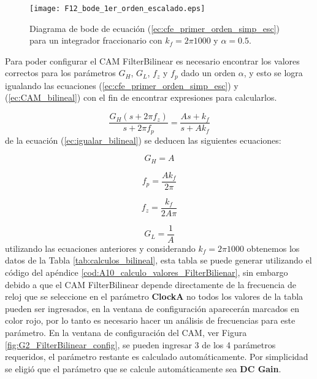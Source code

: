 	\begin{figure}[hbtp]
		\caption{Diagrama de bode de ecuación (\ref{ec:cfe_primer_orden_simp_esc}) para un integrador fraccionario con $k_{f} = 2\pi 1000$ y  $\alpha = 0.5$.} 
		\label{fig:F12_bode_1er_orden_escalado}
		\centering
		\texttt{[image: F12\_bode\_1er\_orden\_escalado.eps]}
	\end{figure}
	
	 Para poder configurar el CAM FilterBilinear es necesario encontrar los valores correctos para los parámetros $G_{H}$, $G_{L}$, $f_{z}$ y $f_{p}$ dado un orden $\alpha$, y esto se logra igualando las ecuaciones (\ref{ec:cfe_primer_orden_simp_esc}) y (\ref{ec:CAM_bilineal}) con el fin de encontrar expresiones para calcularlos.
	 
	 \begin{equation}
	 \frac{G_{H}(s + 2 \pi f_{z})}{s + 2 \pi f_{p}} = \frac{As + k_{f}}{s + A k_{f}}
	 \label{ec:igualar_bilineal}
	 \end{equation}
	 de la ecuación (\ref{ec:igualar_bilineal}) se deducen las siguientes ecuaciones:
	 
	 \begin{equation}
		 G_{H} = A
		 \label{ec:bilineal_gh}
	 \end{equation}
	 
	 \begin{equation}
	 	f_{p} = \frac{A k_{f}}{2 \pi}
	 	\label{ec:bilineal_fp}
	 \end{equation}
	 
	 \begin{equation}
		f_{z} = \frac{k_{f}}{ 2A \pi}
		\label{ec:bilineal_fz}
	 \end{equation}
	 
	 \begin{equation}
	 G_{L} = \frac{1}{A}
	 \label{ec:bilineal_gl}
	 \end{equation}
	utilizando las ecuaciones anteriores y considerando $k_{f} = 2 \pi 1000$ obtenemos los datos de la Tabla \ref{tab:calculos_bilineal}, esta tabla se puede generar utilizando el código del apéndice \ref{cod:A10_calculo_valores_FilterBilienar}, sin embargo debido a que el CAM FilterBilinear depende directamente de la frecuencia de reloj que se seleccione en el parámetro \textbf{ClockA} no todos los valores de la tabla pueden ser ingresados, en la ventana de configuración aparecerán marcados en color rojo, por lo tanto  es necesario hacer un análisis de frecuencias para este parámetro. En la ventana de configuración del CAM, ver Figura \ref{fig:G2_FilterBilinear_config}, se pueden ingresar 3 de los 4 parámetros requeridos, el parámetro restante es calculado automáticamente. Por simplicidad se eligió que el parámetro que se calcule automáticamente sea \textbf{DC Gain}. 
	   
